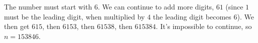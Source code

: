 The number must start with $6$. We can continue to add more digits, $61$ (since $1$ must be the leading digit, when multiplied by $4$ the leading digit becomes $6$). We then get $615$, then $6153$, then $61538$, then $615384$. It's impossible to continue, so $n=153846$.
